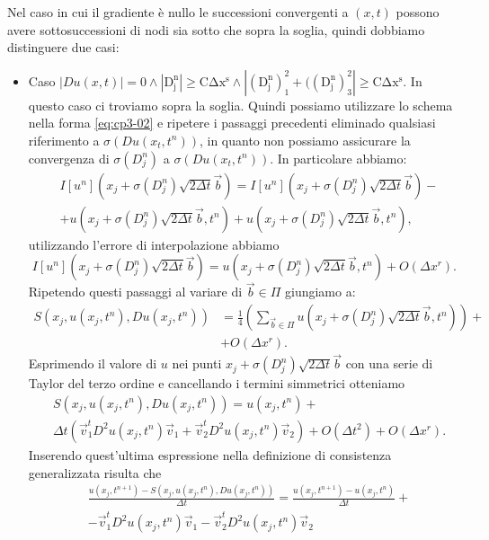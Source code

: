 Nel caso in cui il gradiente è nullo le successioni convergenti a $(x,t)$ possono avere sottosuccessioni di nodi sia sotto che sopra la soglia, quindi dobbiamo distinguere due casi:
\begin{itemize}
  \item \textsf{Caso} $|Du(x,t)|=0\land\mathrm{|D_j^n|\ge C\Delta x^s\land|(D_j^n)_1^2+((D_j^n)_3^2|\ge C\Delta x^s}$. In questo caso ci troviamo sopra la soglia. Quindi possiamo utilizzare lo schema nella forma \eqref{eq:cp3-02} e ripetere i passaggi precedenti eliminado qualsiasi riferimento a $\sigma(Du(x_t,t^n))$, in quanto non possiamo assicurare la convergenza di $\sigma(D_j^n)$ a $\sigma(Du(x_t,t^n))$. In particolare abbiamo:
\[
  \begin{split}
    & I[u^n](x_j+\sigma(D_j^n)\sqrt{2\Delta t}\vec{b}) = I[u^n](x_j+\sigma(D_j^n)\sqrt{2\Delta t}\vec{b}) - \\
    & +u(x_j+\sigma(D_j^n)\sqrt{2\Delta t}\vec{b},t^n) + u(x_j+\sigma(D_j^n)\sqrt{2\Delta t}\vec{b},t^n),
  \end{split}
\]
utilizzando l'errore di interpolazione abbiamo
\[
I[u^n](x_j+\sigma(D_j^n)\sqrt{2\Delta t}\vec{b})=u(x_j+\sigma(D_j^n)\sqrt{2\Delta t}\vec{b},t^n) + O(\Delta x^r).
\]
Ripetendo questi passaggi al variare di $\vec{b}\in\Pi$ giungiamo a:
\[
 \begin{split}
 S(x_j,u(x_j,t^n),Du(x_j,t^n))&=\frac{1}{4}\left(\sum_{\vec{b}\in\Pi}u(x_j+\sigma(D_j^n)\sqrt{2\Delta t}\vec{b},t^n)\right)+\\
  &+ O(\Delta x^r).
 \end{split}
\]
Esprimendo il valore di $u$ nei punti $x_j+\sigma(D_j^n)\sqrt{2\Delta t}\vec{b}$ con una serie di Taylor del terzo ordine e cancellando i termini simmetrici otteniamo
\begin{equation}
  \label{eq:cp3-11}
  \begin{split}
    &S(x_j,u(x_j,t^n),Du(x_j,t^n)) = u(x_j,t^n) + \\
    &\Delta t\left(\vec{v}_1^tD^2u(x_j,t^n)\vec{v}_1 + \vec{v}_2^tD^2u(x_j,t^n)\vec{v}_2\right) + O(\Delta t^2) + O(\Delta x^r).
   \end{split}
\end{equation}
Inserendo quest'ultima espressione nella definizione di consistenza generalizzata risulta che
\[
\begin{split}
  &\frac{u(x_j,t^{n+1})-S(x_j,u(x_j,t^n),Du(x_j,t^n))}{\Delta t}= \frac{u(x_j,t^{n+1})-u(x_j,t^n)}{\Delta t} + \\
  &  -\vec{v}_1^tD^2u(x_j,t^n)\vec{v}_1 -\vec{v}_2^tD^2u(x_j,t^n)\vec{v}_2  

\end{split}\]
\end{itemize}

